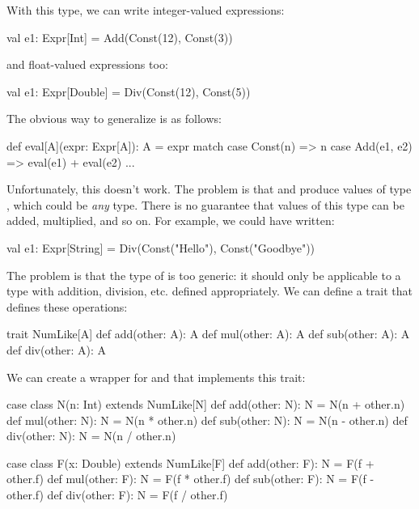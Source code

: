 \documentclass{book}
\begin{document}
With this type, we can write integer-valued expressions:
\begin{scalacode}
val e1: Expr[Int] = Add(Const(12), Const(3))
\end{scalacode}
and float-valued expressions too:
\begin{scalacode}
val e1: Expr[Double] = Div(Const(12), Const(5))
\end{scalacode}

The obvious way to generalize  is as follows:

\begin{scalacode}
def eval[A](expr: Expr[A]): A = expr match {
  case Const(n) => n
  case Add(e1, e2) => eval(e1) + eval(e2)
  ...
}
\end{scalacode}

Unfortunately, this doesn't work. The problem is that 
and  produce values of type , which could
be \emph{any} type. There is no guarantee that values of this type can
be added, multiplied, and so on. For example, we could have written:

\begin{scalacode}
val e1: Expr[String] = Div(Const("Hello"), Const("Goodbye"))
\end{scalacode}

The problem is that the type of  is too generic: it should
only be applicable to a type with addition, division, etc. defined appropriately.
We can define a trait that defines these operations:

\begin{scalacode}
trait NumLike[A] {
  def add(other: A): A
  def mul(other: A): A
  def sub(other: A): A
  def div(other: A): A
}
\end{scalacode}

We can create a wrapper for  and 
that implements this trait:

\begin{scalacode}
case class N(n: Int) extends NumLike[N] {
  def add(other: N): N = N(n + other.n)
  def mul(other: N): N = N(n * other.n)
  def sub(other: N): N = N(n - other.n)
  def div(other: N): N = N(n / other.n)
}

case class F(x: Double) extends NumLike[F] {
  def add(other: F): N = F(f + other.f)
  def mul(other: F): N = F(f * other.f)
  def sub(other: F): N = F(f - other.f)
  def div(other: F): N = F(f / other.f)
}
\end{scalacode}
\end{document}
